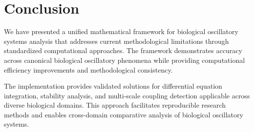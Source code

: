 \documentclass[twocolumn]{article}
\begin{document}
\section{Conclusion}

We have presented a unified mathematical framework for biological oscillatory systems analysis that addresses current methodological limitations through standardized computational approaches. The framework demonstrates accuracy across canonical biological oscillatory phenomena while providing computational efficiency improvements and methodological consistency.

The implementation provides validated solutions for differential equation integration, stability analysis, and multi-scale coupling detection applicable across diverse biological domains. This approach facilitates reproducible research methods and enables cross-domain comparative analysis of biological oscillatory systems.



\end{document}
